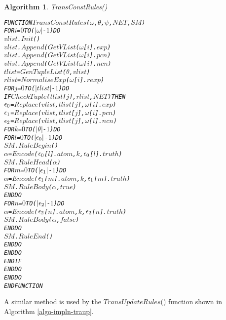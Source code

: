 \documentclass[11pt]{report}
\newenvironment{vverbatim}
{
  \begin{alltt}
}
{
    \vspace{-\baselineskip}
  \end{alltt}
}
\newtheorem{vvalgorithm}{Algorithm}[chapter]
\newenvironment{valgorithm}[2]
{
  \begin{vvalgorithm}{#1}
    \label{#2}
    \small
    \begin{vverbatim}
}
{
    \end{vverbatim}
  \end{vvalgorithm}
}
\begin{document}
          \begin{valgorithm}{TransConstRules()}{algo-impln-traco}
FUNCTION \(TransConstRules\)(\(\omega\), \(\theta\), \(\psi\), \(NET\), \(SM\))
  FOR \(i\) = \(0\) TO (\(|\omega|\) - \(1\)) DO
    \(vlist\).\(Init\)()
    \(vlist\).\(Append\)(\(GetVList\)(\(\omega\)[\(i\)].\(exp\))
    \(vlist\).\(Append\)(\(GetVList\)(\(\omega\)[\(i\)].\(pcn\))
    \(vlist\).\(Append\)(\(GetVList\)(\(\omega\)[\(i\)].\(ncn\))
    \(tlist\) = \(GenTupleList\)(\(\theta\), \(vlist\))
    \(rlist\) = \(NormaliseExp\)(\(\omega\)[\(i\)].\(rexp\))
    FOR \(j\) = \(0\) TO (\(|tlist|\) - \(1\)) DO
      IF \(CheckTuple\)(\(tlist\)[\(j\)], \(rlist\), \(NET\)) THEN
        \(\epsilon\sb{0}\) = \(Replace\)(\(vlist\), \(tlist\)[\(j\)], \(\omega\)[\(i\)].\(exp\))
        \(\epsilon\sb{1}\) = \(Replace\)(\(vlist\), \(tlist\)[\(j\)], \(\omega\)[\(i\)].\(pcn\))
        \(\epsilon\sb{2}\) = \(Replace\)(\(vlist\), \(tlist\)[\(j\)], \(\omega\)[\(i\)].\(ncn\))
        FOR \(k\) = \(0\) TO (\(|\theta|\) - \(1\)) DO
          FOR \(l\) = \(0\) TO (\(|\epsilon\sb{0}|\) - \(1\)) DO
            \(SM\).\(RuleBegin\)()
            \(\alpha\) = \(Encode\)(\(\epsilon\sb{0}\)[\(l\)].\(atom\), \(k\), \(\epsilon\sb{0}\)[\(l\)].\(truth\))
            \(SM\).\(RuleHead\)(\(\alpha\))
            FOR \(m\) = \(0\) TO (\(|\epsilon\sb{1}|\) - \(1\)) DO
              \(\alpha\) = \(Encode\)(\(\epsilon\sb{1}\)[\(m\)].\(atom\), \(k\), \(\epsilon\sb{1}\)[\(m\)].\(truth\))
              \(SM\).\(RuleBody\)(\(\alpha\), \(true\))
            ENDDO
            FOR \(n\) = \(0\) TO (\(|\epsilon\sb{2}|\) - \(1\)) DO
              \(\alpha\) = \(Encode\)(\(\epsilon\sb{2}\)[\(n\)].\(atom\), \(k\), \(\epsilon\sb{2}\)[\(n\)].\(truth\))
              \(SM\).\(RuleBody\)(\(\alpha\), \(false\))
            ENDDO
            \(SM\).\(RuleEnd\)()
          ENDDO
        ENDDO
      ENDIF
    ENDDO
  ENDDO
ENDFUNCTION
          \end{valgorithm}

          A similar method is used by the $TransUpdateRules$() function
          shown in Algorithm \ref{algo-impln-traup}.
\end{document}
